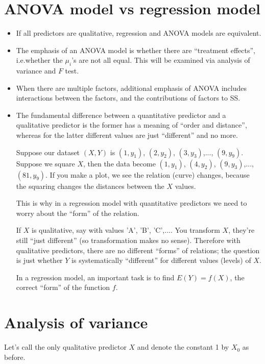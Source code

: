 \documentclass[12pt]{article}
\begin{document}
\section{ANOVA model vs regression model}

\begin{itemize}
\item If all predictors are qualitative,
regression and ANOVA models are equivalent.
\item The emphasis of an ANOVA model is whether there are ``treatment
effects'', i.e.\@ whether the $\mu_i$'s are not all equal.
This will be examined via analysis of variance and $F$ test.

\item When there are multiple factors, additional emphasis of ANOVA
includes interactions between the factors, and the contributions
of factors to SS.

\item The fundamental difference between a quantitative predictor and a
qualitative predictor is the former has a meaning of ``order and
distance'', whereas for the latter different values are just
``different'' and no more.

Suppose our dataset $(X, Y)$ is
$(1,y_1)$, $(2,y_2)$, $(3,y_3)$,..., $(9, y_9)$.
Suppose we square $X$, then the data become
$(1, y_1)$, $(4, y_2)$, $(9, y_3)$,..., $(81, y_9)$.
If you make a plot, we see the relation (curve) changes, because the
squaring changes the distances between the $X$ values.

This is why in a regression model with quantitative predictors we need
to worry about the ``form'' of the relation.

If $X$ is qualitative, say with values 'A', 'B', 'C',....
You transform $X$, they're still ``just different'' (so transformation
makes no sense). Therefore with qualitative predictors, there are no
different ``forms'' of relations; the question is just whether $Y$ is
systematically ``different'' for different values (levels) of $X$.

In a regression model, an important task is to find
$E(Y) = f(X)$, the correct ``form'' of the function $f$.
\end{itemize}

\section{Analysis of variance}

Let's call the only qualitative predictor $X$
and denote the constant 1 by $X_0$ as before.
\end{document}
